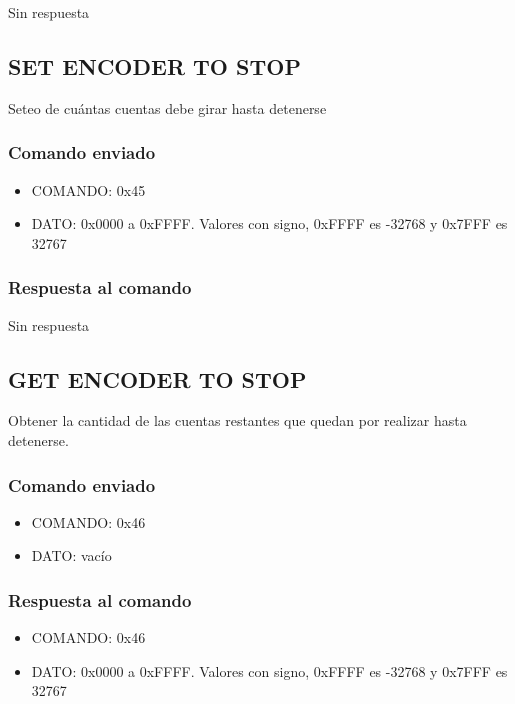 \documentclass[a4paper,10pt]{article}
\begin{document}
Sin respuesta

\subsection{SET ENCODER TO STOP}
\label{set_encoder_to_stop}

Seteo de cu\'antas cuentas debe girar hasta detenerse

\subsubsection*{Comando enviado}

\begin{itemize}
	\item{COMANDO:} 0x45
	\item{DATO:} 0x0000 a 0xFFFF. Valores con signo, 0xFFFF es -32768 y 0x7FFF es 32767
\end{itemize}

\subsubsection*{Respuesta al comando}

Sin respuesta

\subsection{GET ENCODER TO STOP}
\label{get_encoder_to_stop}

Obtener la cantidad de las cuentas restantes que quedan por realizar hasta detenerse.

\subsubsection*{Comando enviado}

\begin{itemize}
	\item{COMANDO:} 0x46
	\item{DATO:} vac\'io
\end{itemize}

\subsubsection*{Respuesta al comando}

\begin{itemize}
	\item{COMANDO:} 0x46
	\item{DATO:} 0x0000 a 0xFFFF. Valores con signo, 0xFFFF es -32768 y 0x7FFF es 32767
\end{itemize}
\end{document}
